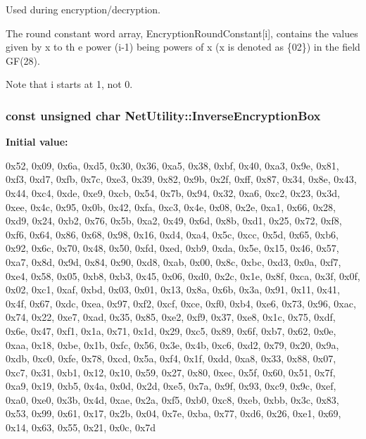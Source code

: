 Used during encryption/decryption. 

The round constant word array, EncryptionRoundConstant\mbox{[}i\mbox{]}, contains the values given by x to th e power (i-\/1) being powers of x (x is denoted as \{02\}) in the field GF(28). \par
 Note that i starts at 1, not 0. \hypertarget{class_net_utility_af110cf0b6c348c10e3ab60454df79a84}{
\subsubsection[{InverseEncryptionBox}]{\setlength{\rightskip}{0pt plus 5cm}const unsigned char {\bf NetUtility::InverseEncryptionBox}}}
\label{class_net_utility_af110cf0b6c348c10e3ab60454df79a84}
{\bfseries Initial value:}
\begin{DoxyCode}

        {
                0x52, 0x09, 0x6a, 0xd5, 0x30, 0x36, 0xa5, 0x38, 0xbf, 0x40, 0xa3,
       0x9e, 0x81, 0xf3, 0xd7, 0xfb,
                0x7c, 0xe3, 0x39, 0x82, 0x9b, 0x2f, 0xff, 0x87, 0x34, 0x8e, 0x43,
       0x44, 0xc4, 0xde, 0xe9, 0xcb,
                0x54, 0x7b, 0x94, 0x32, 0xa6, 0xc2, 0x23, 0x3d, 0xee, 0x4c, 0x95,
       0x0b, 0x42, 0xfa, 0xc3, 0x4e,
                0x08, 0x2e, 0xa1, 0x66, 0x28, 0xd9, 0x24, 0xb2, 0x76, 0x5b, 0xa2,
       0x49, 0x6d, 0x8b, 0xd1, 0x25,
                0x72, 0xf8, 0xf6, 0x64, 0x86, 0x68, 0x98, 0x16, 0xd4, 0xa4, 0x5c,
       0xcc, 0x5d, 0x65, 0xb6, 0x92,
                0x6c, 0x70, 0x48, 0x50, 0xfd, 0xed, 0xb9, 0xda, 0x5e, 0x15, 0x46,
       0x57, 0xa7, 0x8d, 0x9d, 0x84,
                0x90, 0xd8, 0xab, 0x00, 0x8c, 0xbc, 0xd3, 0x0a, 0xf7, 0xe4, 0x58,
       0x05, 0xb8, 0xb3, 0x45, 0x06,
                0xd0, 0x2c, 0x1e, 0x8f, 0xca, 0x3f, 0x0f, 0x02, 0xc1, 0xaf, 0xbd,
       0x03, 0x01, 0x13, 0x8a, 0x6b,
                0x3a, 0x91, 0x11, 0x41, 0x4f, 0x67, 0xdc, 0xea, 0x97, 0xf2, 0xcf,
       0xce, 0xf0, 0xb4, 0xe6, 0x73,
                0x96, 0xac, 0x74, 0x22, 0xe7, 0xad, 0x35, 0x85, 0xe2, 0xf9, 0x37,
       0xe8, 0x1c, 0x75, 0xdf, 0x6e,
                0x47, 0xf1, 0x1a, 0x71, 0x1d, 0x29, 0xc5, 0x89, 0x6f, 0xb7, 0x62,
       0x0e, 0xaa, 0x18, 0xbe, 0x1b,
                0xfc, 0x56, 0x3e, 0x4b, 0xc6, 0xd2, 0x79, 0x20, 0x9a, 0xdb, 0xc0,
       0xfe, 0x78, 0xcd, 0x5a, 0xf4,
                0x1f, 0xdd, 0xa8, 0x33, 0x88, 0x07, 0xc7, 0x31, 0xb1, 0x12, 0x10,
       0x59, 0x27, 0x80, 0xec, 0x5f,
                0x60, 0x51, 0x7f, 0xa9, 0x19, 0xb5, 0x4a, 0x0d, 0x2d, 0xe5, 0x7a,
       0x9f, 0x93, 0xc9, 0x9c, 0xef,
                0xa0, 0xe0, 0x3b, 0x4d, 0xae, 0x2a, 0xf5, 0xb0, 0xc8, 0xeb, 0xbb,
       0x3c, 0x83, 0x53, 0x99, 0x61,
                0x17, 0x2b, 0x04, 0x7e, 0xba, 0x77, 0xd6, 0x26, 0xe1, 0x69, 0x14,
       0x63, 0x55, 0x21, 0x0c, 0x7d
        }
\end{DoxyCode}


